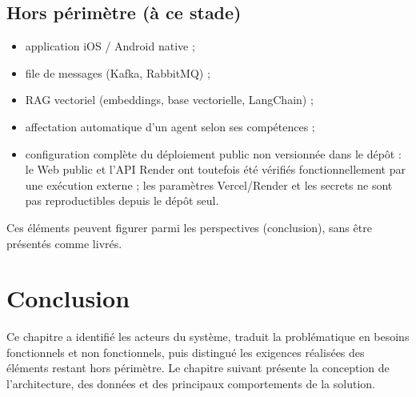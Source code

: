 \subsection{Hors périmètre (à ce stade)}

\begin{itemize}[leftmargin=1.4em]
  \item application iOS / Android native ;
  \item file de messages (Kafka, RabbitMQ) ;
  \item RAG vectoriel (embeddings, base vectorielle, LangChain) ;
  \item affectation automatique d'un agent selon ses compétences ;
  \item configuration complète du déploiement public non versionnée dans le dépôt : le Web public et l'API Render ont toutefois été vérifiés fonctionnellement par une exécution externe ; les paramètres Vercel/Render et les secrets ne sont pas reproductibles depuis le dépôt seul.
\end{itemize}

Ces éléments peuvent figurer parmi les perspectives (conclusion), sans être présentés comme livrés.

\section{Conclusion}

Ce chapitre a identifié les acteurs du système, traduit la problématique en besoins fonctionnels et non fonctionnels, puis distingué les exigences réalisées des éléments restant hors périmètre. Le chapitre suivant présente la conception de l'architecture, des données et des principaux comportements de la solution.
